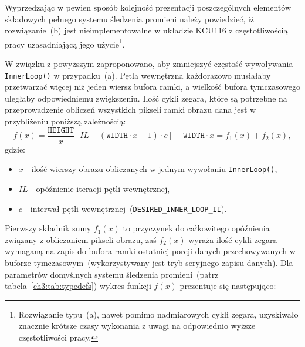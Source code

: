 \begin{enumerate}
Wyprzedzając w pewien sposób kolejność prezentacji poszczególnych elementów składowych pełnego systemu śledzenia promieni należy powiedzieć, iż rozwiązanie~(b) jest nieimplementowalne w układzie KCU116 z częstotliwością pracy uzasadniającą jego użycie\footnote{Rozwiązanie typu~(a), nawet pomimo nadmiarowych cykli zegara, uzyskiwało znacznie krótsze czasy wykonania z uwagi na odpowiednio wyższe częstotliwości pracy.}. 

W związku z powyższym zaproponowano, aby zmniejszyć częstość wywoływania \texttt{InnerLoop()} w przypadku~(a). Pętla wewnętrzna każdorazowo musiałaby przetwarzać więcej niż jeden wiersz bufora ramki, a wielkość bufora tymczasowego uległaby odpowiedniemu zwiększeniu. Ilość cykli zegara, które są potrzebne na przeprowadzenie obliczeń wszystkich pikseli ramki obrazu dana jest w przybliżeniu poniższą zależnością:
\begin{equation}
f(x) = \frac{\mathtt{HEIGHT}}{x}\left[IL + \left(\mathtt{WIDTH}\cdot x - 1 \right) \cdot c \right] + \mathtt{WIDTH}\cdot x = f_1(x) + f_2(x),
\label{ch3:eq:dataflow_latency}
\end{equation}
gdzie:
\begin{itemize}
\item[] $x$ - ilość wierszy obrazu obliczanych w jednym wywołaniu \texttt{InnerLoop()},
\item[] $IL$ - opóźnienie iteracji pętli wewnętrznej,
\item[] $c$ - interwał pętli wewnętrznej~(\texttt{DESIRED\_INNER\_LOOP\_II}).
\end{itemize}
Pierwszy składnik sumy $f_1(x)$ to przyczynek do całkowitego opóźnienia związany z obliczaniem pikseli obrazu, zaś $f_2(x)$ wyraża ilość cykli zegara wymaganą na zapis do bufora ramki ostatniej porcji danych przechowywanych w buforze tymczasowym~(wykorzystywany jest tryb seryjnego zapisu danych). Dla parametrów domyślnych systemu śledzenia promieni~(patrz tabela~\ref{ch3:tab:typedefs}) wykres funkcji $f(x)$ prezentuje się następująco:



\end{enumerate}
